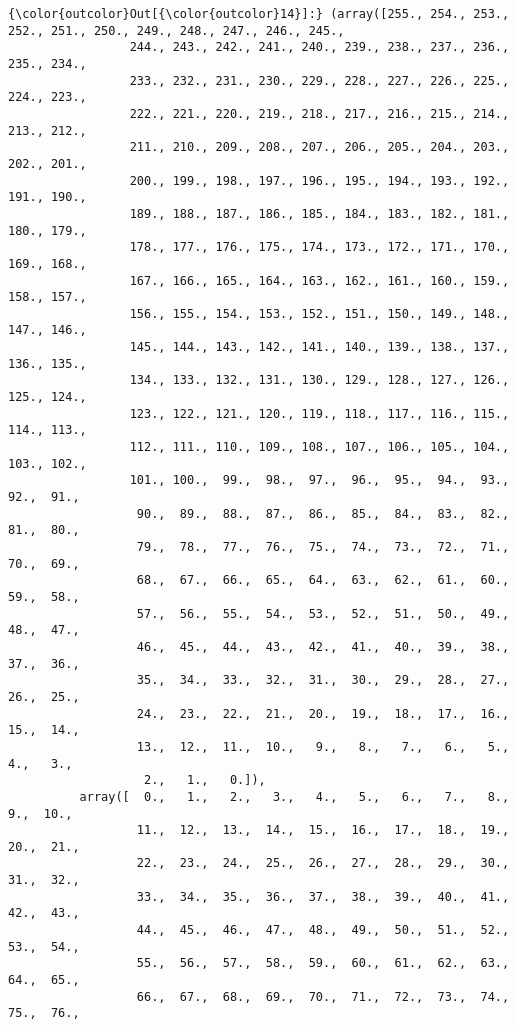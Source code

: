 \documentclass[11pt]{article}
\begin{document}
\begin{Verbatim}[commandchars=\\\{\}]
{\color{outcolor}Out[{\color{outcolor}14}]:} (array([255., 254., 253., 252., 251., 250., 249., 248., 247., 246., 245.,
                 244., 243., 242., 241., 240., 239., 238., 237., 236., 235., 234.,
                 233., 232., 231., 230., 229., 228., 227., 226., 225., 224., 223.,
                 222., 221., 220., 219., 218., 217., 216., 215., 214., 213., 212.,
                 211., 210., 209., 208., 207., 206., 205., 204., 203., 202., 201.,
                 200., 199., 198., 197., 196., 195., 194., 193., 192., 191., 190.,
                 189., 188., 187., 186., 185., 184., 183., 182., 181., 180., 179.,
                 178., 177., 176., 175., 174., 173., 172., 171., 170., 169., 168.,
                 167., 166., 165., 164., 163., 162., 161., 160., 159., 158., 157.,
                 156., 155., 154., 153., 152., 151., 150., 149., 148., 147., 146.,
                 145., 144., 143., 142., 141., 140., 139., 138., 137., 136., 135.,
                 134., 133., 132., 131., 130., 129., 128., 127., 126., 125., 124.,
                 123., 122., 121., 120., 119., 118., 117., 116., 115., 114., 113.,
                 112., 111., 110., 109., 108., 107., 106., 105., 104., 103., 102.,
                 101., 100.,  99.,  98.,  97.,  96.,  95.,  94.,  93.,  92.,  91.,
                  90.,  89.,  88.,  87.,  86.,  85.,  84.,  83.,  82.,  81.,  80.,
                  79.,  78.,  77.,  76.,  75.,  74.,  73.,  72.,  71.,  70.,  69.,
                  68.,  67.,  66.,  65.,  64.,  63.,  62.,  61.,  60.,  59.,  58.,
                  57.,  56.,  55.,  54.,  53.,  52.,  51.,  50.,  49.,  48.,  47.,
                  46.,  45.,  44.,  43.,  42.,  41.,  40.,  39.,  38.,  37.,  36.,
                  35.,  34.,  33.,  32.,  31.,  30.,  29.,  28.,  27.,  26.,  25.,
                  24.,  23.,  22.,  21.,  20.,  19.,  18.,  17.,  16.,  15.,  14.,
                  13.,  12.,  11.,  10.,   9.,   8.,   7.,   6.,   5.,   4.,   3.,
                   2.,   1.,   0.]),
          array([  0.,   1.,   2.,   3.,   4.,   5.,   6.,   7.,   8.,   9.,  10.,
                  11.,  12.,  13.,  14.,  15.,  16.,  17.,  18.,  19.,  20.,  21.,
                  22.,  23.,  24.,  25.,  26.,  27.,  28.,  29.,  30.,  31.,  32.,
                  33.,  34.,  35.,  36.,  37.,  38.,  39.,  40.,  41.,  42.,  43.,
                  44.,  45.,  46.,  47.,  48.,  49.,  50.,  51.,  52.,  53.,  54.,
                  55.,  56.,  57.,  58.,  59.,  60.,  61.,  62.,  63.,  64.,  65.,
                  66.,  67.,  68.,  69.,  70.,  71.,  72.,  73.,  74.,  75.,  76.,

\end{Verbatim}
\end{document}
